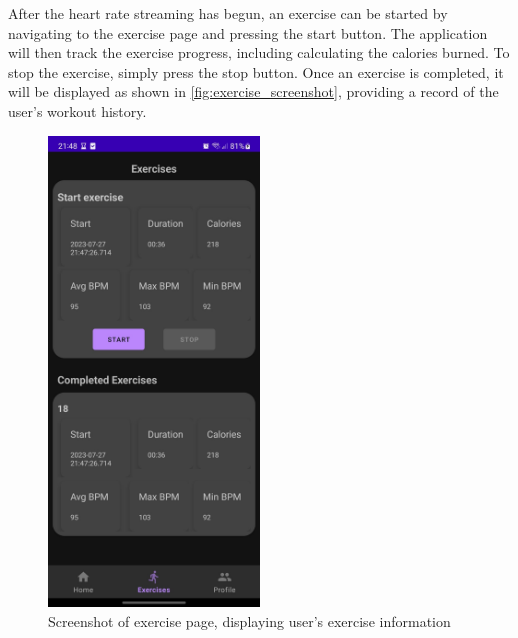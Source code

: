 After the heart rate streaming has begun, an exercise can be started by navigating to the exercise page and pressing the start button.
The application will then track the exercise progress, including calculating the calories burned. 
To stop the exercise, simply press the stop button. Once an exercise is completed, it will be displayed as shown in \autoref{fig:exercise_screenshot}, providing a record of the user's workout history.
\begin{figure}[H]
    \centering
    \includegraphics[width=0.5\textwidth]{images/exercise-tracking-sc.jpeg}
    \caption{Screenshot of exercise page, displaying user's exercise information}
    \label{fig:exercise_screenshot}
\end{figure}


